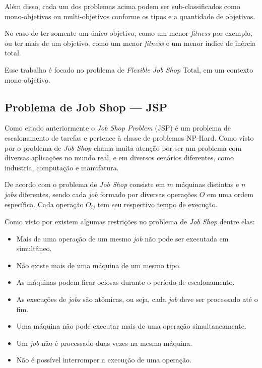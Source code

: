         Além disso, cada um dos problemas acima podem ser sub-classificados como mono-objetivos ou multi-objetivos conforme os tipos e a quantidade de objetivos.\hfill\vspace{\onelineskip}

        No caso de ter somente um único objetivo, como um menor \textit{fitness} por exemplo, ou ter mais de um objetivo, como um menor \textit{fitness} e um menor índice de inércia total.\hfill\vspace{\onelineskip}

        Esse trabalho é focado no problema de \textit{Flexible Job Shop} Total, em um contexto mono-objetivo.


    \subsection{Problema de Job Shop — JSP}
            Como citado anteriormente o \textit{Job Shop Problem} (JSP) é um problema de escalonamento de tarefas e pertence à classe de problemas NP-Hard. Como visto por \cite{Cheng1996} o problema de \textit{Job Shop} chama muita atenção por ser um problema com diversas aplicações no mundo real, e em diversos cenários diferentes, como industria, computação e manufatura.\hfill\vspace{\onelineskip}

            De acordo com \cite{Cheng1996} o problema de \textit{Job Shop} consiste em $m$ máquinas distintas e $n$ \textit{jobs} diferentes, sendo cada \textit{job} formado por diversas operações $O$ em uma ordem específica. Cada operação $O_{ij}$ tem seu respectivo tempo de execução.\hfill\vspace{\onelineskip}

            Como visto por \cite{Bagchi1999} existem algumas restrições no problema de \textit{Job Shop} dentre elas:
            \begin{itemize}
                \item Mais de uma operação de um mesmo \textit{job} não pode ser executada em simultâneo.
                \item Não existe mais de uma máquina de um mesmo tipo.
                \item As máquinas podem ficar ociosas durante o período de escalonamento.
                \item As execuções de \textit{jobs} são atômicas, ou seja, cada \textit{job} deve ser processado até o fim.
                \item Uma máquina não pode executar mais de uma operação simultaneamente.
                \item Um \textit{job} não é processado duas vezes na mesma máquina.
                \item Não é possível interromper a execução de uma operação.
            \end{itemize}
        
